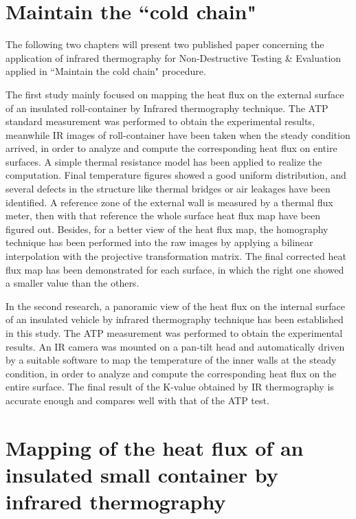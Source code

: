 \chapter*{Maintain the ``cold chain"}     %
The following two chapters will present two published paper concerning the application of infrared thermography for Non-Destructive Testing \& Evaluation applied in ``Maintain the cold chain" procedure.

The first study mainly focused on mapping the heat flux on the external surface of an insulated roll-container by Infrared thermography technique. The ATP standard measurement was performed to obtain the experimental results, meanwhile IR images of roll-container have been taken when the steady condition arrived, in order to analyze and compute the corresponding heat flux on entire surfaces. A simple thermal resistance model has been applied to realize the computation. Final temperature figures showed a good uniform distribution, and several defects in the structure like thermal bridges or air leakages have been identified. A reference zone of the external wall is measured by a thermal flux meter, then with that reference the whole surface heat flux map have been figured out. Besides, for a better view of the heat flux map, the homography technique has been performed into the raw images by applying a bilinear interpolation with the projective transformation matrix. The final corrected heat flux map has been demonstrated for each surface, in which the right one showed a smaller value than the others. 

In the second research, a panoramic view of the heat flux on the internal surface of an insulated vehicle by infrared thermography technique has been established in this study. The ATP measurement was performed to obtain the experimental results.  An IR camera was mounted on a pan-tilt head and automatically driven by a suitable software to map the temperature of the inner walls at the steady condition, in order to analyze and compute the corresponding heat flux on the entire surface.  The final result of the K-value obtained by IR thermography is accurate enough and compares well with that of the ATP test.

\chapter{Mapping of the heat flux of an insulated small container by infrared thermography}
